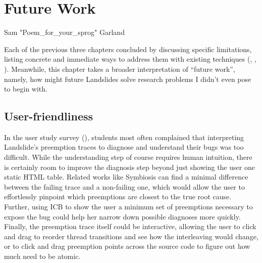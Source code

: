 \chapter{Future Work}
\label{chap:warpzone}
{Sam "Poem\_for\_your\_sprog" Garland}

Each of the previous three chapters concluded by
discussing specific limitations,
listing concrete and immediate ways to address them
with existing techniques
(\sect{\ref{sec:quicksand-discussion}},
\sect{\ref{sec:education-discussion}},
\sect{\ref{sec:tm-discussion}}).
Meanwhile, this chapter takes a broader interpretation of ``future work'',
namely,
how might future Landslides solve research problems I didn't even pose to begin with.

\section{User-friendliness}

In the user study survey (\sect{\ref{sec:education-eval-survey}}),
students most often complained
that interpreting Landslide's preemption traces to diagnose and understand their bugs was too difficult.
While the understanding step of course requires human intuition,
there is certainly room to improve the diagnosis step beyond just showing the user one static HTML table.
Related works like Symbiosis \cite{symbiosis} can find a minimal difference between the failing trace and a non-failing one,
which would allow the user to effortlessly pinpoint which preemptions are closest to the true root cause.
Further, using ICB \cite{chess-icb} to show the user a minimum set of preemptions necessary to expose the bug
could help her narrow down possible diagnoses more quickly.
Finally, the preemption trace itself could be interactive,
allowing the user to click and drag to reorder thread transitions and see how the interleaving would change,
or to click and drag preemption points across the source code to figure out how much need to be atomic.

